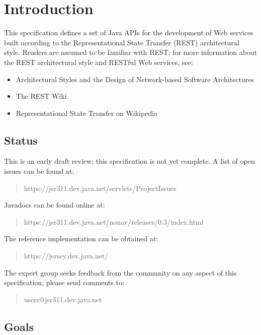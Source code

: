 \chapter{Introduction}

This specification defines a set of Java APIs for the development of Web services built according to the Representational State Transfer\cite{rest} (REST) architectural style. Readers are assumed to be familiar with 
REST; for more information about the REST architectural style and RESTful Web services, see:

\begin{itemize}
\item Architectural Styles and the Design of Network-based Software Architectures\cite{rest}
\item The REST Wiki\cite{restwiki}
\item Representational State Transfer on Wikipedia\cite{restwikipedia}
\end{itemize}

\section{Status}

This is an early draft review; this specification is not yet complete. A list of open issues can be found at:

\begin{quote}
https://jsr311.dev.java.net/servlets/ProjectIssues
\end{quote}

Javadocs can be found online at:

\begin{quote}
https://jsr311.dev.java.net/nonav/releases/0.3/index.html
\end{quote}

The reference implementation can be obtained at:

\begin{quote}
https://jersey.dev.java.net/
\end{quote}

The expert group seeks feedback from the community on any aspect of this specification, please send comments to:

\begin{quote}
users@jsr311.dev.java.net
\end{quote}

\section{Goals}

